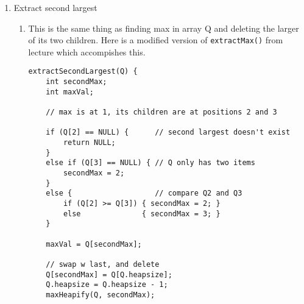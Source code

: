 \documentclass{article}
\begin{document}
\begin{enumerate}
\begin{enumerate}
        Derived from pseudo-code in Lecture 1 slides:
        \begin{lstlisting}[
        linebackgroundcolor={%
        \ifnum\value{lstnumber}=3
                \color{green!35}
        \fi
        \ifnum\value{lstnumber}=9
                \color{green!35}
        \fi
        \ifnum\value{lstnumber}=32
                \color{green!35}
        \fi
                },
]

mergeSortInversions(A,p,r) {
    inv = 0; // variable to track inversions, 
    		// gets passed to merge()
    if (p < r) {
        q = floor((p+r)/2)
        mergeSortInversions(A,p,q)
        mergeSortInversions(A, q+1, r)
        merge(A,p,q,r,inv)
    }
    return inv;
}
            
merge(A, p, q, r, inv) {
    n1 = q - p + 1
    n2 = r - q
    copy A[p,q] to L[1...n1]
    copy A[q+1,r] to R[1...n2]
    L[n1+1] = R[n1+1] = +Inf
    i = j = 1
    for (k=p to r) {
        if (L[i] < R[j]) {
            A[k] = L[i]
            i++
        }
        else {
            // a value R[j] was taken from the right 
            // side in the process of merging;
            // R[j] must be an inversion relative to 
            // everything remaining on the left side
            A[k] = R[j]
            inv += L.length - i
            j++
        }
    }
}
        \end{lstlisting}
    \end{enumerate}
    
    \item Extract second largest
    
    \begin{enumerate}
    	\item This is the same thing as finding max in array Q and deleting the larger of its two children. Here is a modified version of \texttt{extractMax()} from lecture which accompishes this.
    	\begin{lstlisting}
extractSecondLargest(Q) {
	int secondMax;
	int maxVal;

	// max is at 1, its children are at positions 2 and 3
	
	if (Q[2] == NULL) {      // second largest doesn't exist
		return NULL;
	} 
	else if (Q[3] == NULL) { // Q only has two items
		secondMax = 2;
	} 
	else {                   // compare Q2 and Q3
		if (Q[2] >= Q[3]) { secondMax = 2; } 
		else              { secondMax = 3; }
	}
	
	maxVal = Q[secondMax];	
	
	// swap w last, and delete	
	Q[secondMax] = Q[Q.heapsize];
	Q.heapsize = Q.heapsize - 1;
	maxHeapify(Q, secondMax);
	

\end{lstlisting}
\end{enumerate}
\end{enumerate}
\end{document}
